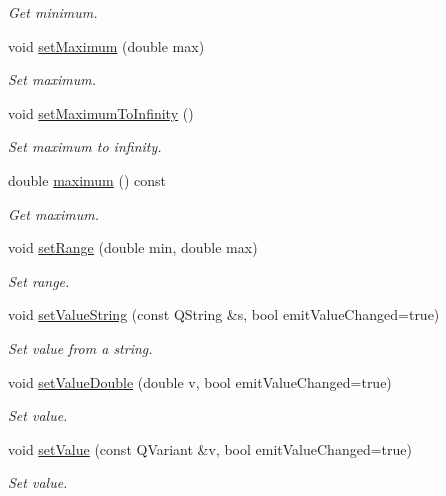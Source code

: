 \begin{DoxyCompactItemize}
\begin{DoxyCompactList}\small\item\em Get minimum. \end{DoxyCompactList}\item 
void \hyperlink{classmdt_double_edit_a3b238d597fcf13bfd6b875ec228435e7}{set\-Maximum} (double max)
\begin{DoxyCompactList}\small\item\em Set maximum. \end{DoxyCompactList}\item 
void \hyperlink{classmdt_double_edit_a4fa7bf1b30590223ec825079e36ab375}{set\-Maximum\-To\-Infinity} ()
\begin{DoxyCompactList}\small\item\em Set maximum to infinity. \end{DoxyCompactList}\item 
double \hyperlink{classmdt_double_edit_a59be46e6f7d976a3a3373b76e03152e9}{maximum} () const 
\begin{DoxyCompactList}\small\item\em Get maximum. \end{DoxyCompactList}\item 
void \hyperlink{classmdt_double_edit_a37e6542c3f29a5db083a3760409d47dc}{set\-Range} (double min, double max)
\begin{DoxyCompactList}\small\item\em Set range. \end{DoxyCompactList}\item 
void \hyperlink{classmdt_double_edit_a6b7d233d74dbb7f587d062aa5ff1abdb}{set\-Value\-String} (const Q\-String \&s, bool emit\-Value\-Changed=true)
\begin{DoxyCompactList}\small\item\em Set value from a string. \end{DoxyCompactList}\item 
void \hyperlink{classmdt_double_edit_ac3c1a762df3ffd84e736f9ce1cbeb702}{set\-Value\-Double} (double v, bool emit\-Value\-Changed=true)
\begin{DoxyCompactList}\small\item\em Set value. \end{DoxyCompactList}\item 
void \hyperlink{classmdt_double_edit_a077b00c2e4ae13e66a2d903a42c0be52}{set\-Value} (const Q\-Variant \&v, bool emit\-Value\-Changed=true)
\begin{DoxyCompactList}\small\item\em Set value. \end{DoxyCompactList}\item 

\end{DoxyCompactItemize}
